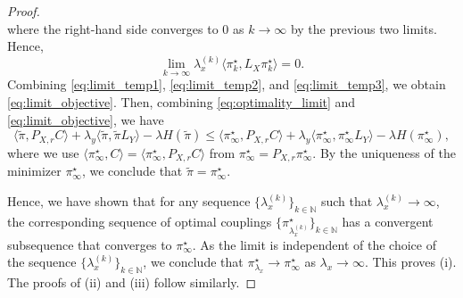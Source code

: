 \documentclass[10pt,a4paper]{amsart}
\begin{document}
\begin{proof}
\begin{equation*}
    \end{equation*}
    where the right-hand side converges to $0$ as $k \to \infty$ by the previous two limits. Hence, 
    \begin{equation}
        \label{eq:limit_temp3}
        \lim_{k \to \infty} \lambda_x^{(k)} \langle \pi^\star_k, L_X \pi^\star_k \rangle = 0.
    \end{equation}
    Combining \eqref{eq:limit_temp1}, \eqref{eq:limit_temp2}, and \eqref{eq:limit_temp3}, we obtain \eqref{eq:limit_objective}. Then, combining \eqref{eq:optimality_limit} and \eqref{eq:limit_objective}, we have
    \begin{equation*}
        \langle \tilde{\pi}, P_{X, r} C \rangle + \lambda_y \langle \tilde{\pi}, \tilde{\pi} L_Y \rangle - \lambda H(\tilde{\pi}) \le \langle \pi^\star_\infty, P_{X, r} C \rangle + \lambda_y \langle \pi^\star_\infty, \pi^\star_\infty L_Y \rangle - \lambda H(\pi^\star_\infty),
    \end{equation*}
    where we use $\langle \pi^\star_\infty, C \rangle = \langle \pi^\star_\infty, P_{X, r} C \rangle$ from $\pi^\star_\infty = P_{X, r} \pi^\star_\infty$. By the uniqueness of the minimizer $\pi^\star_\infty$, we conclude that $\tilde{\pi} = \pi^\star_\infty$.

    Hence, we have shown that for any sequence $\{\lambda_x^{(k)}\}_{k \in \mathbb{N}}$ such that $\lambda_x^{(k)} \to \infty$, the corresponding sequence of optimal couplings $\{\pi^\star_{\lambda_x^{(k)}}\}_{k \in \mathbb{N}}$ has a convergent subsequence that converges to $\pi^\star_\infty$. As the limit is independent of the choice of the sequence $\{\lambda_x^{(k)}\}_{k \in \mathbb{N}}$, we conclude that $\pi^\star_{\lambda_x} \to \pi^\star_\infty$ as $\lambda_x \to \infty$. This proves (i). The proofs of (ii) and (iii) follow similarly.
\end{proof}
\end{document}
